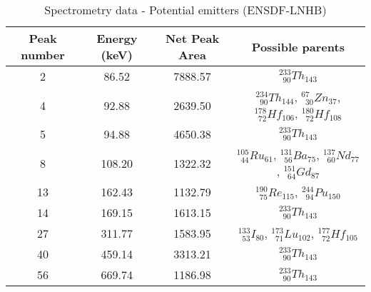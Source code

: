 \renewcommand{\arraystretch}{2}
\begin{table}[!htb]
    \centering
        \begin{tabular}{cccc}
        \hline
        Peak number & Energy (keV) & Net Peak Area & Possible parents \\ \hline\hline
		2           & 86.52        & 7888.57       & $^{233}_{\phantom{0}90}Th_{143}$ \\
		4           & 92.88        & 2639.50       & $^{234}_{\phantom{0}90}Th_{144}$, $^{67}_{\phantom{0}30}Zn_{37}$, $^{178}_{\phantom{0}72}Hf_{106}$, $^{180}_{\phantom{0}72}Hf_{108}$ \\
		5           & 94.88        & 4650.38       & $^{233}_{\phantom{0}90}Th_{143}$ \\
		8           & 108.20       & 1322.32       & $^{105}_{\phantom{0}44}Ru_{61}$, $^{131}_{\phantom{0}56}Ba_{75}$, $^{137}_{\phantom{0}60}Nd_{77}$, $^{151}_{\phantom{0}64}Gd_{87}$ \\
		13          & 162.43       & 1132.79       & $^{190}_{\phantom{0}75}Re_{115}$, $^{244}_{\phantom{0}94}Pu_{150}$ \\
		14          & 169.15       & 1613.15       & $^{233}_{\phantom{0}90}Th_{143}$ \\
		27          & 311.77       & 1583.95       & $^{133}_{\phantom{0}53}I_{80}$, $^{173}_{\phantom{0}71}Lu_{102}$, $^{177}_{\phantom{0}72}Hf_{105}$\\
		40          & 459.14       & 3313.21       & $^{233}_{\phantom{0}90}Th_{143}$\\
		56          & 669.74       & 1186.98       & $^{233}_{\phantom{0}90}Th_{143}$
        \end{tabular}
        \caption{Spectrometry data - Potential emitters (ENSDF-LNHB)}\label{tab:specdata_final}
\end{table}


\
